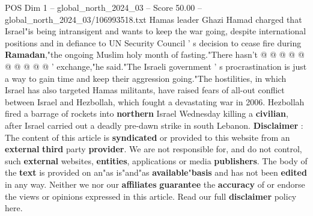 \begin{textsample}{POS Dim 1 – global\_north\_2024\_03 – Score 50.00 – global\_north\_2024\_03/106993518.txt}
Hamas leader Ghazi Hamad charged that Israel"is being intransigent and wants to keep the war going, despite international positions and in defiance to UN Security Council ' s decision to cease fire during \textbf{Ramadan},"the ongoing Muslim holy month of fasting."There hasn't @ @ @ @ @ @ @ @ @ @ ' exchange,"he said."The Israeli government ' s procrastination is just a way to gain time and keep their aggression going."The hostilities, in which Israel has also targeted Hamas militants, have raised fears of all-out conflict between Israel and Hezbollah, which fought a devastating war in 2006.
Hezbollah fired a barrage of rockets into \textbf{northern} Israel Wednesday killing a \textbf{civilian}, after Israel carried out a deadly pre-dawn strike in south Lebanon. \textbf{Disclaimer} : The content of this article is \textbf{syndicated} or provided to this website from an \textbf{external} \textbf{third} party \textbf{provider}.
We are not responsible for, and do not control, such \textbf{external} websites, \textbf{entities}, applications or media \textbf{publishers}.
The body of the \textbf{text} is provided on an"as is"and"as \textbf{available}"\textbf{basis} and has not been \textbf{edited} in any way.
Neither we nor our \textbf{affiliates} \textbf{guarantee} the \textbf{accuracy} of or endorse the views or opinions expressed in this article.
Read our full \textbf{disclaimer} policy here.

\end{textsample}
